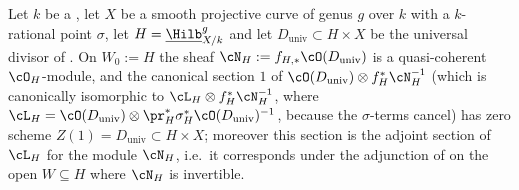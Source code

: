 \begin{lemma}
\label{lem:pc-universal-adjoint-section}
Let $k$ be a ,
let $X$ be a smooth projective curve of genus $g$ over $k$ with a
$k$-rational point $\sigma$, let $H=\underline{\Hilb}^g_{X/k}$ and let
$D_{\mathrm{univ}}\subset H\times X$ be the universal divisor of
.  On $W_0:=H$ the sheaf
$\cN_H:=f_{H,*}\cO(D_{\mathrm{univ}})$ is a quasi-coherent
$\cO_H$-module, and the canonical section $1$ of
$\cO(D_{\mathrm{univ}})\otimes f_H^*\cN_H^{-1}$ (which is canonically
isomorphic to
$\cL_H\otimes f_H^*\cN_H^{-1}$, where
$\cL_H=\cO(D_{\mathrm{univ}})\otimes\pr_H^*\sigma_H^*\cO(D_{\mathrm{univ}})^{-1}$,
because the $\sigma$-terms cancel) has zero scheme
$Z(1)=D_{\mathrm{univ}}\subset H\times X$; moreover this section is the
adjoint section of $\cL_H$ for the module $\cN_H$, i.e.\ it corresponds
under the adjunction of  on the open
$W\subseteq H$ where $\cN_H$ is invertible.
\end{lemma}
